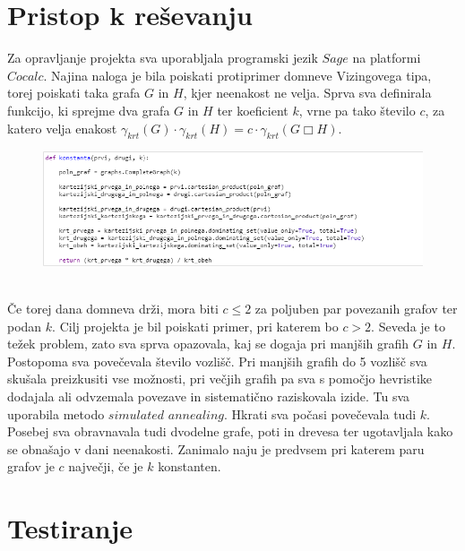 \documentclass[12pt, a4paper]{article}
\begin{document}
\section{Pristop k reševanju}
Za opravljanje projekta sva uporabljala programski jezik $Sage$ na platformi $Cocalc$. Najina naloga je bila poiskati protiprimer domneve Vizingovega tipa, torej poiskati taka grafa $G$ in $H$, kjer neenakost ne velja. Sprva sva definirala funkcijo, ki sprejme dva grafa $G$ in $H$ ter koeficient $k$, vrne pa tako število $c$, za katero velja enakost $\gamma_{krt}(G) \cdot \gamma_{krt}(H) = c \cdot \gamma_{krt}(G \Box H)$. 
\begin{figure}[h!]
\centering
\includegraphics[width=\linewidth]{slika_1}
\end{figure} \\
Če torej dana domneva drži, mora biti $c \leq 2$ za poljuben par povezanih grafov ter podan $k$. Cilj projekta je bil poiskati primer, pri katerem bo $c>2$. Seveda je to težek problem, zato sva sprva opazovala, kaj se dogaja pri manjših grafih $G$ in $H$. Postopoma sva povečevala število vozlišč. Pri manjših grafih do 5 vozlišč sva skušala preizkusiti vse možnosti, pri večjih grafih pa sva s pomočjo hevristike dodajala ali odvzemala povezave in sistematično raziskovala izide. Tu sva uporabila metodo $simulated$ $annealing$. Hkrati sva počasi povečevala tudi $k$. Posebej sva obravnavala tudi dvodelne grafe, poti in drevesa ter ugotavljala kako se obnašajo v dani neenakosti. Zanimalo naju je predvsem pri katerem paru grafov je $c$ največji, če je $k$ konstanten.

\section{Testiranje}
\end{document}
